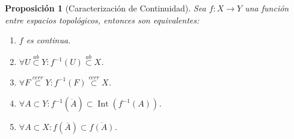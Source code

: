 \documentclass[10pt,a4paper,openright]{book}
\theoremstyle{break}
\newtheorem*{prop}{Proposición}
\DeclareMathOperator{\inter}{Int}
\begin{document}
\begin{prop}[Caracterización de Continuidad]
Sea $f:X\rightarrow Y$ una función entre espacios topológicos, entonces son equivalentes:
\begin{enumerate}
    \item $f$ es continua.
    \item $\forall U \stackrel{ab}{\subset} Y : f^{-1}\left( U \right) \stackrel{ab}{\subset} X$.
    \item $\forall F \stackrel{cerr}{\subset} Y : f^{-1}\left( F \right) \stackrel{cerr}{\subset} X$.
    \item $\forall A \subset Y : f^{-1}\left( \mathring{A} \right) \subset \inter\left( f^{-1}\left( A \right) \right)$.
    \item $\forall A \subset X : f\left( \overline{A} \right) \subset \overline{f\left( A \right)}$.
\end{enumerate}
\end{prop}
\end{document}
